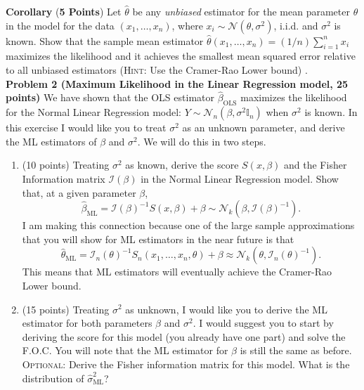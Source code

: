 \documentclass[11pt]{article} %
\begin{document}
\noindent \textbf{Corollary} (\textbf{5 Points}) Let $\widehat{\theta}$ be any \emph{unbiased} estimator for the mean parameter $\theta$ in the model for the data $(x_1,\ldots, x_n)$, where $x_i \sim \mathcal{N}(\theta, \sigma^2)$, i.i.d. and $\sigma^2$ is known. Show that the sample mean estimator
$\widehat{\theta}(x_1, \ldots, x_n) = (1/n) \sum_{i=1}^{n} x_i$
\noindent maximizes the likelihood and it achieves the smallest mean squared error relative to all unbiased estimators ({\scshape Hint:} Use the Cramer-Rao Lower bound) . \\

\noindent \textbf{Problem 2 (Maximum Likelihood in the Linear Regression model, 25 points)} We have shown that the OLS estimator $\widehat{\beta}_{\textrm{OLS}}$ maximizes the likelihood for the Normal Linear Regression model: $Y \sim \mathcal{N}_{n} (\beta, \sigma^2 \mathbb{I}_n)$ when $\sigma^2$ is known. In this exercise I would like you to treat $\sigma^2$ as an unknown parameter, and derive the ML estimators of $\beta$ and $\sigma^2$. We will do this in two steps. 
\begin{enumerate}
\item  (10 points) Treating $\sigma^2$ as known, derive the score $S(x,\beta)$ and the Fisher Information matrix $\mathcal{I}(\beta)$  in the Normal Linear Regression model. Show that, at a given parameter $\beta$, 
	\[ \widehat{\beta}_{\textrm{ML}} =  \mathcal{I}(\beta)^{-1} S(x,\beta)  + \beta   \sim \mathcal{N}_k ( \beta, \mathcal{I}(\beta)^{-1} ). \]
	I am making this connection because one of the large sample approximations that you will show for ML estimators in the near future is that
	\[ \widehat{\theta}_{\textrm{ML}} =  \mathcal{I}_n(\theta)^{-1} S_n(x_1, \ldots, x_n,\theta)  + \beta   \approx \mathcal{N}_k ( \theta, \mathcal{I}_n(\theta)^{-1} ). \]
This means that ML estimators will eventually achieve the Cramer-Rao Lower bound.  \\

\item (15 points) Treating $\sigma^2$ as unknown, I would like you to derive the ML estimator for both parameters $\beta$ and $\sigma^2$. I would suggest you to start by deriving the score for this model (you already have one part) and solve the F.O.C. You will note that the ML estimator for $\beta$ is still the same as before. {\scshape Optional:} Derive the Fisher information matrix for this model. What is the distribution of $\widehat{\sigma}^2_{\textrm{ML}}$? 

\end{enumerate}
\end{document}
